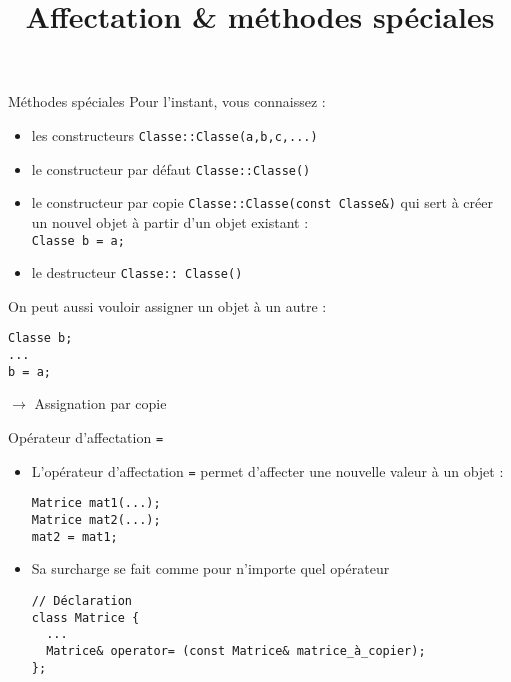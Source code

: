 \documentclass[c]{beamer}
\title{Affectation \& méthodes spéciales}
\newcommand{\inline}[1]{\texttt{#1}}
\begin{document}
\maketitle


\begin{frame}[fragile]{Méthodes spéciales}
Pour l'instant, vous connaissez :
\begin{itemize}
  \item les constructeurs \inline{Classe::Classe(a,b,c,...)}
  \item le constructeur par défaut \inline{Classe::Classe()}
  \item le constructeur par copie \inline{Classe::Classe(const Classe&)} qui sert à créer un nouvel objet à partir d'un objet existant :\\ \inline{Classe b = a;}
  \item le destructeur \inline{Classe::~Classe()}
\end{itemize}
\pause
\vspace{1em}
On peut aussi vouloir assigner un objet à un autre :
\begin{verbatim}
Classe b;
...
b = a;
\end{verbatim}
$\rightarrow$ Assignation par copie
\end{frame}


\begin{frame}[fragile]{Opérateur d'affectation \texttt{=}}
 \begin{itemize}
\item L'opérateur d'affectation \texttt{=} permet d'affecter une nouvelle valeur à un objet  :

\begin{verbatim}
Matrice mat1(...);
Matrice mat2(...);
mat2 = mat1;
\end{verbatim}

\vspace{1em}
\item Sa surcharge se fait comme pour n'importe quel opérateur

\begin{verbatim}
// Déclaration
class Matrice {
  ...
  Matrice& operator= (const Matrice& matrice_à_copier);
};
\end{verbatim}
\end{itemize}
\end{frame}
\end{document}

